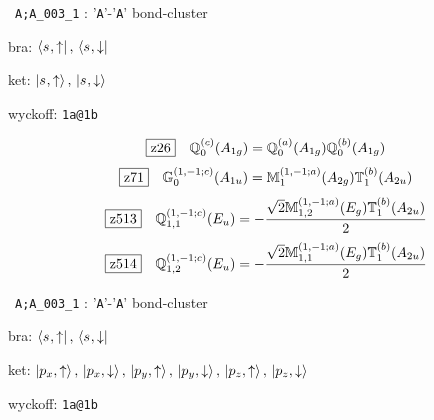 \documentclass[fleqn,10pt,landscape]{jsarticle}
\begin{document}
\noindent\textbullet\, \texttt{A;A_003_1} : '\texttt{A}'-'\texttt{A}' bond-cluster

\noindent\quad * bra: $\bra{s_{},\uparrow},\, \bra{s_{},\downarrow}$

\noindent\quad * ket: $\ket{s_{},\uparrow},\, \ket{s_{},\downarrow}$

\noindent\quad * wyckoff: \texttt{1a@1b}

\begin{dmath*}
\hspace*{3mm}\fbox{z26}\quad \mathbb{Q}_{0}^{(c)}(A_{1g})=\mathbb{Q}_{0}^{(a)}(A_{1g}) \mathbb{Q}_{0}^{(b)}(A_{1g})
\end{dmath*}
\begin{dmath*}
\hspace*{3mm}\fbox{z71}\quad \mathbb{G}_{0}^{(1,-1;c)}(A_{1u})=\mathbb{M}_{1}^{(1,-1;a)}(A_{2g}) \mathbb{T}_{1}^{(b)}(A_{2u})
\end{dmath*}
\begin{dmath*}
\hspace*{3mm}\fbox{z513}\quad \mathbb{Q}_{1,1}^{(1,-1;c)}(E_{u})=- \frac{\sqrt{2} \mathbb{M}_{1,2}^{(1,-1;a)}(E_{g}) \mathbb{T}_{1}^{(b)}(A_{2u})}{2}
\end{dmath*}
\begin{dmath*}
\hspace*{3mm}\fbox{z514}\quad \mathbb{Q}_{1,2}^{(1,-1;c)}(E_{u})=- \frac{\sqrt{2} \mathbb{M}_{1,1}^{(1,-1;a)}(E_{g}) \mathbb{T}_{1}^{(b)}(A_{2u})}{2}
\end{dmath*}
\vspace{5mm}

\noindent\textbullet\, \texttt{A;A_003_1} : '\texttt{A}'-'\texttt{A}' bond-cluster

\noindent\quad * bra: $\bra{s_{},\uparrow},\, \bra{s_{},\downarrow}$

\noindent\quad * ket: $\ket{p_{x},\uparrow},\, \ket{p_{x},\downarrow},\, \ket{p_{y},\uparrow},\, \ket{p_{y},\downarrow},\, \ket{p_{z},\uparrow},\, \ket{p_{z},\downarrow}$

\noindent\quad * wyckoff: \texttt{1a@1b}
\end{document}
